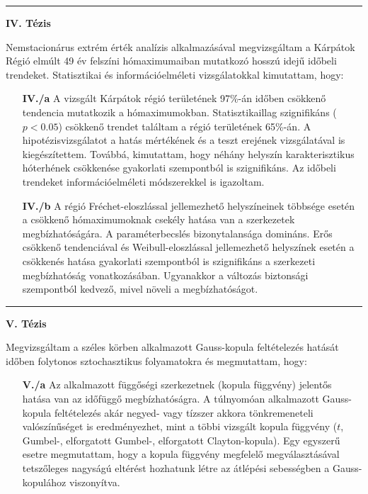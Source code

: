 \begin{otherlanguage}{hungarian}
\begin{center}
	\noindent\rule[0.5ex]{0.5\linewidth}{0.5pt}
	\item[\textbf{IV. Tézis}] \hfill
\end{center}
Nemstacionárus extrém érték analízis alkalmazásával megvizsgáltam a Kárpátok Régió elmúlt 49 év felszíni hómaximumaiban mutatkozó hosszú idejű időbeli trendeket. Statisztikai és információelméleti vizsgálatokkal kimutattam, hogy:
\begin{enumerate}[leftmargin=*, align=left, labelwidth=*]
	\item[\textbf{IV./a}] A vizsgált Kárpátok régió területének 97\%-án időben csökkenő tendencia mutatkozik a hómaximumokban. Statisztikaillag szignifikáns ($p < 0.05$) csökkenő trendet találtam a régió területének 65\%-án. A hipotézisvizsgálatot a hatás mértékének és a teszt erejének vizsgálatával is kiegészítettem. Továbbá, kimutattam, hogy néhány helyszín karakterisztikus hóterhének csökkenése gyakorlati szempontból is szignifikáns. Az időbeli trendeket információelméleti módszerekkel is igazoltam.
	
	\item[\textbf{IV./b}] A régió Fréchet-eloszlással jellemezhető helyszíneinek többsége esetén a csökkenő hómaximumoknak csekély hatása van a szerkezetek megbízhatóságára. A paraméterbecslés bizonytalansága domináns. Erős csökkenő tendenciával és Weibull-eloszlással jellemezhető helyszínek esetén a csökkenés hatása gyakorlati szempontból is szignifikáns a szerkezeti megbízhatóság vonatkozásában. Ugyanakkor a változás biztonsági szempontból kedvező, mivel növeli a megbízhatóságot.
\end{enumerate}

\citep{RozsasIdojaras2016, RozsasAMM2016, SykoraIALCCE2016}


\begin{center}
	\noindent\rule[0.5ex]{0.5\linewidth}{0.5pt}
	\item[\textbf{V. Tézis}] \hfill
\end{center}
Megvizsgáltam a széles körben alkalmazott Gauss-kopula feltételezés hatását időben folytonos sztochasztikus folyamatokra és megmutattam, hogy:
\begin{enumerate}[leftmargin=*, align=left, labelwidth=*]
  \item[\textbf{V./a}] Az alkalmazott függőségi szerkezetnek (kopula függvény) jelentős hatása van az időfüggő megbízhatóságra. A túlnyomóan alkalmazott Gauss-kopula feltételezés akár negyed- vagy tízszer akkora tönkremeneteli valószínűséget is eredményezhet, mint a többi vizsgált kopula függvény ($t$, Gumbel-, elforgatott Gumbel-, elforgatott Clayton-kopula). Egy egyszerű esetre megmutattam, hogy a kopula függvény megfelelő megválasztásával tetszőleges nagyságú eltérést hozhatunk létre az átlépési sebességben a Gauss-kopulához viszonyítva.
  

\end{enumerate}
\end{otherlanguage}
